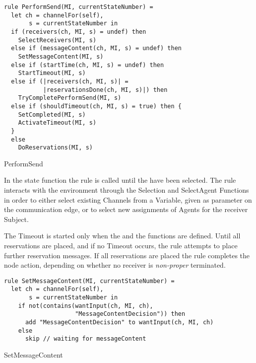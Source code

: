 

\begin{listing}[H]
\begin{verbatim}
rule PerformSend(MI, currentStateNumber) =
  let ch = channelFor(self),
       s = currentStateNumber in
  if (receivers(ch, MI, s) = undef) then
    SelectReceivers(MI, s)
  else if (messageContent(ch, MI, s) = undef) then
    SetMessageContent(MI, s)
  else if (startTime(ch, MI, s) = undef) then
    StartTimeout(MI, s)
  else if (|receivers(ch, MI, s)| =
           |reservationsDone(ch, MI, s)|) then
    TryCompletePerformSend(MI, s)
  else if (shouldTimeout(ch, MI, s) = true) then {
    SetCompleted(MI, s)
    ActivateTimeout(MI, s)
  }
  else
    DoReservations(MI, s)
\end{verbatim}
\caption{PerformSend}
\label{lst:shortasm:PerformSend}
\end{listing}


In the state function the  rule is called until
the  have been selected. The  rule
interacts with the environment through the Selection and SelectAgent Functions
in order to either select existing Channels from a Variable, given as parameter
on the communication edge, or to select new assignments of Agents for the receiver
Subject.

The Timeout is started only when the  and the
 functions are defined. Until all reservations are
placed, and if no Timeout occurs, the  rule attempts
to place further reservation messages. If all reservations are placed the
 rule completes the node action, depending
on whether no receiver is \textit{non-proper} terminated.


\begin{listing}[H]
\begin{verbatim}
rule SetMessageContent(MI, currentStateNumber) =
  let ch = channelFor(self),
       s = currentStateNumber in
    if not(contains(wantInput(ch, MI, ch),
                    "MessageContentDecision")) then
      add "MessageContentDecision" to wantInput(ch, MI, ch)
    else
      skip // waiting for messageContent
\end{verbatim}
\caption{SetMessageContent}
\label{lst:shortasm:SetMessageContent}
\end{listing}



